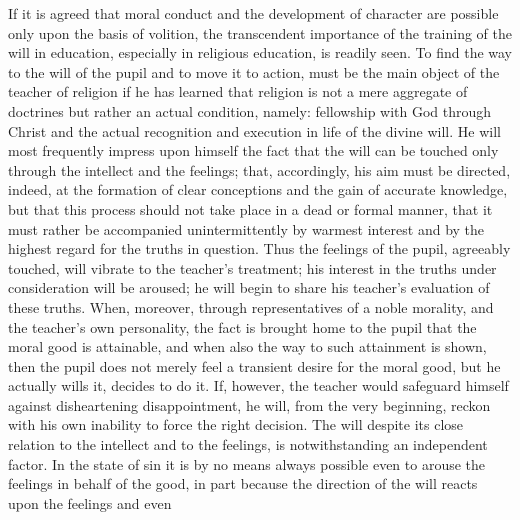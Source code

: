 If it is agreed that moral conduct and the development of character are possible only upon the basis of volition, the transcendent importance of the training of the will in education, especially in religious education, is readily seen. To find the way to the will of the pupil and to move it to action, must be the main object of the teacher of religion if he has learned that religion is not a mere aggregate of doctrines but rather an actual condition, namely: fellowship with God through Christ and the actual recognition and execution in life of the divine will. He will most frequently impress upon himself the fact that the will can be touched only through the intellect and the feelings; that, accordingly, his aim must be directed, indeed, at the formation of clear conceptions and the gain of accurate knowledge, but that this process should not take place in a dead or formal manner, that it must rather be accompanied unintermittently by warmest interest and by the highest regard for the truths in question. Thus the feelings of the pupil, agreeably touched, will vibrate to the teacher’s treatment; his interest in the truths under consideration will be aroused; he will begin to share his teacher’s evaluation of these truths. When, moreover, through representatives of a noble morality, and the teacher’s own personality, the fact is brought home to the pupil that the moral good is attainable, and when also the way to such attainment is shown, then the pupil does not merely feel a transient desire for the moral good, but he actually wills it, decides to do it. If, however, the teacher would safeguard himself against disheartening disappointment, he will, from the very beginning, reckon with his own inability to force the right decision. The will despite its close relation to the intellect and to the feelings, is notwithstanding an independent factor. In the state of sin it is by no means always possible even to arouse the feelings in behalf of the good, in part because the direction of the will reacts upon the feelings and even
